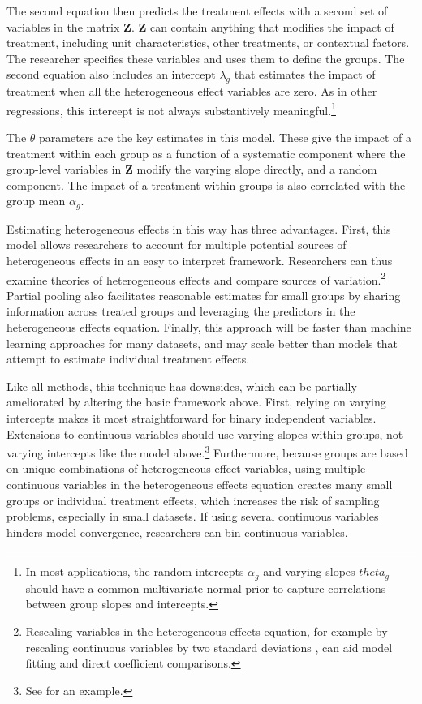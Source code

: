 \documentclass[12pt]{article}
\begin{document}
The second equation then predicts the treatment effects with a second set of variables in the matrix \textbf{Z}. 
\textbf{Z} can contain anything that modifies the impact of treatment, including unit characteristics, other treatments, or contextual factors. 
The researcher specifies these variables and uses them to define the groups. 
The second equation also includes an intercept $\lambda_g$ that estimates the impact of treatment when all the heterogeneous effect variables are zero.
As in other regressions, this intercept is not always substantively meaningful.\footnote{In most applications, the random intercepts $\alpha_g$ and varying slopes $theta_g$ should have a common multivariate normal prior to capture correlations between group slopes and intercepts.}


The $\theta$ parameters are the key estimates in this model.
These give the impact of a treatment within each group as a function of a systematic component where the group-level variables in \textbf{Z} modify the varying slope directly, and a random component. 
The impact of a treatment within groups is also correlated with the group mean $\alpha_g$.  



Estimating heterogeneous effects in this way has three advantages.
First, this model allows researchers to account for multiple potential sources of heterogeneous effects in an easy to interpret framework. 
Researchers can thus examine theories of heterogeneous effects and compare sources of variation.\footnote{Rescaling variables in the heterogeneous effects equation, for example by rescaling continuous variables by two standard deviations \citep{Gelman2008}, can aid model fitting and direct coefficient comparisons.} 
Partial pooling also facilitates reasonable estimates for small groups by sharing information across treated groups and leveraging the predictors in the heterogeneous effects equation. 
Finally, this approach will be faster than machine learning approaches for many datasets, and may scale better than models that attempt to estimate individual treatment effects.


Like all methods, this technique has downsides, which can be partially ameliorated by altering the basic framework above. 
First, relying on varying intercepts makes it most straightforward for binary independent variables. 
Extensions to continuous variables should use varying slopes within groups, not varying intercepts like the model above.\footnote{See \citet{Alley2021isq} for an example.}
Furthermore, because groups are based on unique combinations of heterogeneous effect variables, using multiple continuous variables in the heterogeneous effects equation creates many small groups or individual treatment effects, which increases the risk of sampling problems, especially in small datasets. 
If using several continuous variables hinders model convergence, researchers can bin continuous variables.
\end{document}
